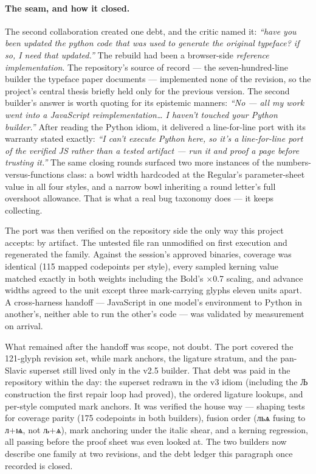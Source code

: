 \documentclass[12pt]{article}
\newcommand{\cz}[1]{{\chu #1}}
\begin{document}
\paragraph{The seam, and how it closed.} The second collaboration created one debt, and the critic named it: \emph{``have you been updated the python code that was used to generate the original typeface? if so, I need that updated.''} The rebuild had been a browser-side \emph{reference implementation}. The repository's source of record — the seven-hundred-line builder the typeface paper documents — implemented none of the revision, so the project's central thesis briefly held only for the previous version. The second builder's answer is worth quoting for its epistemic manners: \emph{``No --- all my work went into a JavaScript reimplementation\ldots{} I haven't touched your Python builder.''} After reading the Python idiom, it delivered a line-for-line port with its warranty stated exactly: \emph{``I can't execute Python here, so it's a line-for-line port of the verified JS rather than a tested artifact — run it and proof a page before trusting it.''} The same closing rounds surfaced two more instances of the numbers-versus-functions class: a bowl width hardcoded at the Regular's parameter-sheet value in all four styles, and a narrow bowl inheriting a round letter's full overshoot allowance. That is what a real bug taxonomy does — it keeps collecting.

The port was then verified on the repository side the only way this project accepts: by artifact. The untested file ran unmodified on first execution and regenerated the family. Against the session's approved binaries, coverage was identical (115 mapped codepoints per style), every sampled kerning value matched exactly in both weights including the Bold's $\times$0.7 scaling, and advance widths agreed to the unit except three mark-carrying glyphs eleven units apart. A cross-harness handoff — JavaScript in one model's environment to Python in another's, neither able to run the other's code — was validated by measurement on arrival.

What remained after the handoff was scope, not doubt. The port covered the 121-glyph revision set, while mark anchors, the ligature stratum, and the pan-Slavic superset still lived only in the v2.5 builder. That debt was paid in the repository within the day: the superset redrawn in the v3 idiom (including the \cz{Љ} construction the first repair loop had proved), the ordered ligature lookups, and per-style computed mark anchors. It was verified the house way — shaping tests for coverage parity (175 codepoints in both builders), fusion order (\cz{льѧ} fusing to \cz{л}+\cz{ѩ}, not \cz{љ}+\cz{ѧ}), mark anchoring under the italic shear, and a kerning regression, all passing before the proof sheet was even looked at. The two builders now describe one family at two revisions, and the debt ledger this paragraph once recorded is closed.
\end{document}
